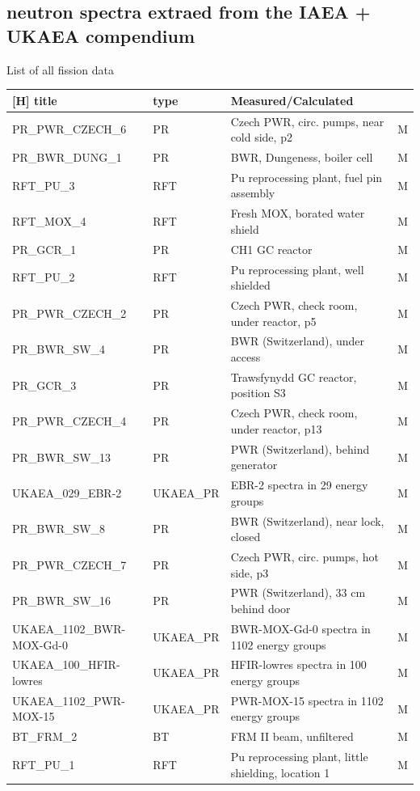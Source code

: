 \documentclass[a4paper, 12pt]{article}
\begin{document}
\begin{appendices}
\section{neutron spectra extraed from the IAEA + UKAEA compendium}\label{fission-fusion spectra IAEUKAEACompendium}
List of all fission data
\begin{longtable}{llll}[H]
title & type &Measured/Calculated\\
\hline
PR\_PWR\_CZECH\_6 & PR & Czech PWR, circ. pumps, near cold side, p2  & M\\
PR\_BWR\_DUNG\_1 & PR & BWR, Dungeness, boiler cell  & M\\
RFT\_PU\_3 & RFT & Pu reprocessing plant, fuel pin assembly  & M\\
RFT\_MOX\_4 & RFT & Fresh MOX, borated water shield  & M\\
PR\_GCR\_1 & PR & CH1 GC reactor  & M\\
RFT\_PU\_2 & RFT & Pu reprocessing plant, well shielded  & M\\
PR\_PWR\_CZECH\_2 & PR & Czech PWR, check room, under reactor, p5  & M\\
PR\_BWR\_SW\_4 & PR & BWR (Switzerland), under access  & M\\
PR\_GCR\_3 & PR & Trawsfynydd GC reactor, position S3  & M\\
PR\_PWR\_CZECH\_4 & PR & Czech PWR, check room, under reactor, p13  & M\\
PR\_BWR\_SW\_13 & PR & PWR (Switzerland), behind generator  & M\\
UKAEA\_029\_EBR-2 & UKAEA\_PR & EBR-2 spectra in 29 energy groups & M\\
PR\_BWR\_SW\_8 & PR & BWR (Switzerland), near lock, closed  & M\\
PR\_PWR\_CZECH\_7 & PR & Czech PWR, circ. pumps, hot side, p3  & M\\
PR\_BWR\_SW\_16 & PR & PWR (Switzerland), 33 cm behind door  & M\\
UKAEA\_1102\_BWR-MOX-Gd-0 & UKAEA\_PR & BWR-MOX-Gd-0 spectra in 1102 energy groups & M\\
UKAEA\_100\_HFIR-lowres & UKAEA\_PR & HFIR-lowres spectra in 100 energy groups & M\\
UKAEA\_1102\_PWR-MOX-15 & UKAEA\_PR & PWR-MOX-15 spectra in 1102 energy groups & M\\
BT\_FRM\_2 & BT & FRM II beam, unfiltered  & M\\
RFT\_PU\_1 & RFT & Pu reprocessing plant, little shielding, location 1  & M\\

\end{longtable}
\end{appendices}
\end{document}
